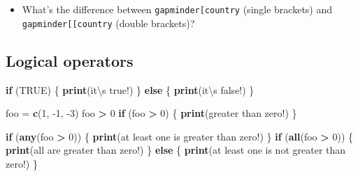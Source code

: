 \documentclass[
]{article}
\newenvironment{Shaded}{\begin{snugshade}}{\end{snugshade}}
\newcommand{\CharTok}[1]{\textcolor[rgb]{0.31,0.60,0.02}{#1}}
\newcommand{\ControlFlowTok}[1]{\textcolor[rgb]{0.13,0.29,0.53}{\textbf{#1}}}
\newcommand{\DecValTok}[1]{\textcolor[rgb]{0.00,0.00,0.81}{#1}}
\newcommand{\KeywordTok}[1]{\textcolor[rgb]{0.13,0.29,0.53}{\textbf{#1}}}
\newcommand{\NormalTok}[1]{#1}
\newcommand{\OperatorTok}[1]{\textcolor[rgb]{0.81,0.36,0.00}{\textbf{#1}}}
\newcommand{\OtherTok}[1]{\textcolor[rgb]{0.56,0.35,0.01}{#1}}
\newcommand{\StringTok}[1]{\textcolor[rgb]{0.31,0.60,0.02}{#1}}
\providecommand{\tightlist}{%
  \setlength{\itemsep}{0pt}\setlength{\parskip}{0pt}}
\begin{document}
\begin{itemize}
\tightlist
\item
  What's the difference between \texttt{gapminder{[}\textquotesingle{}country\textquotesingle{}{]}} (single brackets) and \texttt{gapminder{[}{[}\textquotesingle{}country\textquotesingle{}{]}{]}} (double brackets)?
\end{itemize}

\hypertarget{logical-operators}{%
\subsection{Logical operators}\label{logical-operators}}

\begin{Shaded}
\begin{Highlighting}[]
\ControlFlowTok{if}\NormalTok{ (}\OtherTok{TRUE}\NormalTok{) \{}
  \KeywordTok{print}\NormalTok{(}\StringTok{\textquotesingle{}it}\CharTok{\textbackslash{}\textquotesingle{}}\StringTok{s true!\textquotesingle{}}\NormalTok{)}
\NormalTok{\} }\ControlFlowTok{else}\NormalTok{ \{}
  \KeywordTok{print}\NormalTok{(}\StringTok{\textquotesingle{}it}\CharTok{\textbackslash{}\textquotesingle{}}\StringTok{s false!\textquotesingle{}}\NormalTok{)}
\NormalTok{\}}

\NormalTok{foo =}\StringTok{ }\KeywordTok{c}\NormalTok{(}\DecValTok{1}\NormalTok{, }\DecValTok{{-}1}\NormalTok{, }\DecValTok{{-}3}\NormalTok{)}
\NormalTok{foo }\OperatorTok{\textgreater{}}\StringTok{ }\DecValTok{0}
\ControlFlowTok{if}\NormalTok{ (foo }\OperatorTok{\textgreater{}}\StringTok{ }\DecValTok{0}\NormalTok{) \{}
  \KeywordTok{print}\NormalTok{(}\StringTok{\textquotesingle{}greater than zero!\textquotesingle{}}\NormalTok{)}
\NormalTok{\}}

\ControlFlowTok{if}\NormalTok{ (}\KeywordTok{any}\NormalTok{(foo }\OperatorTok{\textgreater{}}\StringTok{ }\DecValTok{0}\NormalTok{)) \{}
  \KeywordTok{print}\NormalTok{(}\StringTok{\textquotesingle{}at least one is greater than zero!\textquotesingle{}}\NormalTok{)}
\NormalTok{\}}
\ControlFlowTok{if}\NormalTok{ (}\KeywordTok{all}\NormalTok{(foo }\OperatorTok{\textgreater{}}\StringTok{ }\DecValTok{0}\NormalTok{)) \{}
  \KeywordTok{print}\NormalTok{(}\StringTok{\textquotesingle{}all are greater than zero!\textquotesingle{}}\NormalTok{)}
\NormalTok{\} }\ControlFlowTok{else}\NormalTok{ \{}
  \KeywordTok{print}\NormalTok{(}\StringTok{\textquotesingle{}at least one is not greater than zero!\textquotesingle{}}\NormalTok{)}
\NormalTok{\}}


\end{Highlighting}
\end{Shaded}
\end{document}
